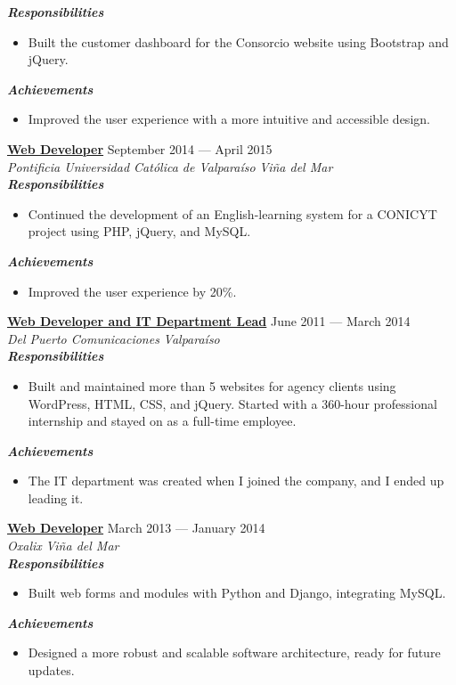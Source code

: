 \documentclass[11pt,a4paper]{article}
\newcommand{\job}[4]{%
    \textbf{\underline{#1}} \hfill #2\\
    \textit{#3} \hfill \textit{#4}\\[2pt]
}
\newcommand{\newsubsection}[1]{
    \vspace{0em}
    \textbf{\textit{#1}}
    \vspace{0em}
}
\begin{document}
\newsubsection{Responsibilities}
\begin{itemize}[leftmargin=*, noitemsep, topsep=2pt]
    \item Built the customer dashboard for the Consorcio website using Bootstrap and jQuery.
\end{itemize}
\newsubsection{Achievements}
\begin{itemize}[leftmargin=*, noitemsep, topsep=2pt]
    \item Improved the user experience with a more intuitive and accessible design.
\end{itemize}


\job{Web Developer}{September 2014 --- April 2015}{Pontificia Universidad Católica de Valparaíso}{Viña del Mar}
\newsubsection{Responsibilities}
\begin{itemize}[leftmargin=*, noitemsep, topsep=2pt]
    \item Continued the development of an English-learning system for a CONICYT project using PHP, jQuery, and MySQL.
\end{itemize}

\newsubsection{Achievements}
\begin{itemize}[leftmargin=*, noitemsep, topsep=2pt]
    \item Improved the user experience by 20\%.
\end{itemize}

\job{Web Developer and IT Department Lead}{June 2011 --- March 2014}{Del Puerto Comunicaciones}{Valparaíso}
\newsubsection{Responsibilities}
\begin{itemize}[leftmargin=*, noitemsep, topsep=2pt]
    \item Built and maintained more than 5 websites for agency clients using WordPress, HTML, CSS, and jQuery. Started with a 360-hour professional internship and stayed on as a full-time employee.
    
\end{itemize}
\newsubsection{Achievements}
\begin{itemize}[leftmargin=*, noitemsep, topsep=2pt]
    \item The IT department was created when I joined the company, and I ended up leading it.
\end{itemize}

\job{Web Developer}{March 2013 --- January 2014}{Oxalix}{Viña del Mar}
\newsubsection{Responsibilities}
\begin{itemize}[leftmargin=*, noitemsep, topsep=2pt]
    \item Built web forms and modules with Python and Django, integrating MySQL.
\end{itemize}
\newsubsection{Achievements}
\begin{itemize}[leftmargin=*, noitemsep, topsep=2pt]
    \item Designed a more robust and scalable software architecture, ready for future updates.
\end{itemize}
\end{document}
